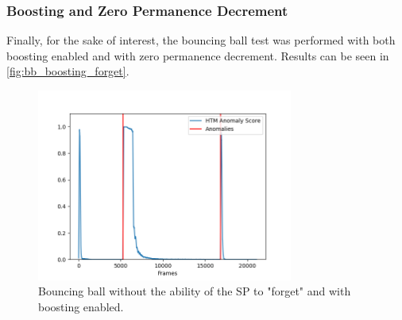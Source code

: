 \subsubsection{Boosting and Zero Permanence Decrement}
Finally, for the sake of interest, the bouncing ball test was performed with both boosting enabled and with zero permanence decrement. Results can be seen in \autoref{fig:bb_boosting_forget}.
\begin{figure}[H]
    \centering
    \includegraphics[width=0.75\textwidth]{resources/experiments/bouncing_ball/bb_anoms_unforgetting_boosting.png}
    \caption{Bouncing ball without the ability of the SP to "forget" and with boosting enabled.}
    \label{fig:bb_boosting_forget}
\end{figure}
